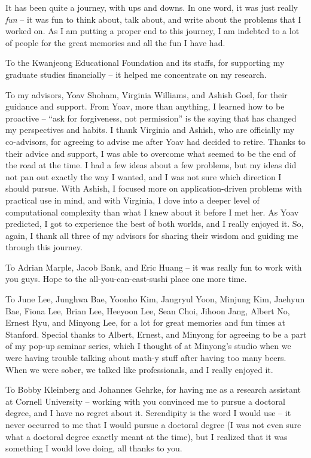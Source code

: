 It has been quite a journey, with ups and downs.
In one word, it was just really {\em fun} -- it was fun to think about, talk about, and write about the problems that I worked on. 
As I am putting a proper end to this journey, I am indebted to a lot of people for the great memories and all the fun I have had.

To the Kwanjeong Educational Foundation and its staffs, for supporting my graduate studies financially -- it helped me concentrate on my research.

To my advisors, Yoav Shoham, Virginia Williams, and Ashish Goel, for their guidance and support. From Yoav, more than anything, I learned how to be proactive -- ``ask for forgiveness, not permission'' is the saying that has changed my perspectives and habits. I thank Virginia and Ashish, who are officially my co-advisors, for agreeing to advise me after Yoav had decided to retire. Thanks to their advice and support, I was able to overcome what seemed to be the end of the road at the time. I had a few ideas about a few problems, but my ideas did not pan out exactly the way I wanted, and I was not sure which direction I should pursue. With Ashish, I focused more on application-driven problems with practical use in mind, and with Virginia, I dove into a deeper level of computational complexity than what I knew about it before I met her. As Yoav predicted, I got to experience the best of both worlds, and I really enjoyed it. So, again, I thank all three of my advisors for sharing their wisdom and guiding me through this journey.

To Adrian Marple, Jacob Bank, and Eric Huang -- it was really fun to work with you guys. Hope to the all-you-can-east-sushi place one more time.

To June Lee, Junghwa Bae, Yoonho Kim, Jangryul Yoon, Minjung Kim, Jaehyun Bae, Fiona Lee, Brian Lee, Heeyoon Lee, Sean Choi, Jihoon Jang, Albert No, Ernest Ryu, and Minyong Lee, for a lot for great memories and fun times at Stanford. 
Special thanks to Albert, Ernest, and Minyong for agreeing to be a part of my pop-up seminar series, which I thought of at Minyong's studio when we were having trouble talking about math-y stuff after having too many beers. When we were sober, we talked like professionals, and I really enjoyed it. 



To Bobby Kleinberg and Johannes Gehrke, for having me as a research assistant at Cornell University -- working with you convinced me to pursue a doctoral degree, and I have no regret about it. Serendipity is the word I would use -- it never occurred to me that I would pursue a doctoral degree (I was not even sure what a doctoral degree exactly meant at the time), but I realized that it was something I would love doing, all thanks to you. 

